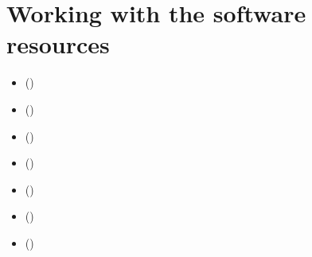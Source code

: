 \documentclass[a4paper,10pt,english]{sphinxhowto}
\begin{document}
\section{Working with the  software resources}
\label{\detokenize{tutorial:working-with-the-digraph3-software-resources}}\label{\detokenize{tutorial:digraphs-tutorial-label}}
\begin{sphinxShadowBox}
\begin{itemize}
\item {} 
\label{\detokenize{tutorial:id163}}{\hyperref[\detokenize{tutorial:purpose}]{}} ()

\item {} 
\label{\detokenize{tutorial:id164}}{\hyperref[\detokenize{tutorial:downloading-of-the-digraph3-resources}]{}} ()

\item {} 
\label{\detokenize{tutorial:id165}}{\hyperref[\detokenize{tutorial:starting-a-python3-session}]{}} ()

\item {} 
\label{\detokenize{tutorial:id166}}{\hyperref[\detokenize{tutorial:digraph-object-structure}]{}} ()

\item {} 
\label{\detokenize{tutorial:id167}}{\hyperref[\detokenize{tutorial:permanent-storage}]{}} ()

\item {} 
\label{\detokenize{tutorial:id168}}{\hyperref[\detokenize{tutorial:inspecting-a-digraph-object}]{}} ()

\item {} 
\label{\detokenize{tutorial:id169}}{\hyperref[\detokenize{tutorial:special-classes}]{}} ()

\end{itemize}
\end{sphinxShadowBox}
\end{document}
